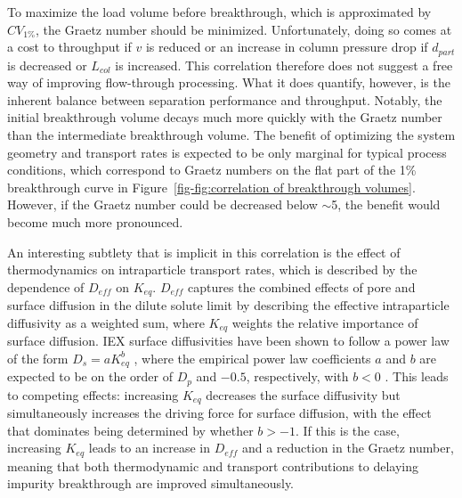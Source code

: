 \documentclass[preprint,review,12pt]{elsarticle}
\begin{document}
        To maximize the load volume before breakthrough, which is approximated by $CV_{1\%}$, the Graetz number should be minimized. Unfortunately, doing so comes at a cost to throughput if $v$ is reduced or an increase in column pressure drop if $d_{part}$ is decreased or $L_{col}$ is increased. This correlation therefore does not suggest a free way of improving flow-through processing. What it does quantify, however, is the inherent balance between separation performance and throughput. Notably, the initial breakthrough volume decays much more quickly with the Graetz number than the intermediate breakthrough volume. The benefit of optimizing the system geometry and transport rates is expected to be only marginal for typical process conditions, which correspond to Graetz numbers on the flat part of the 1\% breakthrough curve in Figure~\ref{fig-fig:correlation of breakthrough volumes}. However, if the Graetz number could be decreased below $\sim$5, the benefit would become much more pronounced.

        An interesting subtlety that is implicit in this correlation is the effect of thermodynamics on intraparticle transport rates, which is described by the dependence of $D_{eff}$ on $K_{eq}$. $D_{eff}$ captures the combined effects of pore and surface diffusion in the dilute solute limit by describing the effective intraparticle diffusivity as a weighted sum, where $K_{eq}$ weights the relative importance of surface diffusion. IEX surface diffusivities have been shown to follow a power law of the form $D_s = a K_{eq}^b$ \cite{Khanal7004}, where the empirical power law coefficients $a$ and $b$ are expected to be on the order of $D_p$ and $-0.5$, respectively, with $b < 0$ \cite{Wesselingh2001, Lenhoff2008}. This leads to competing effects: increasing $K_{eq}$ decreases the surface diffusivity but simultaneously increases the driving force for surface diffusion, with the effect that dominates being determined by whether $b > -1$. If this is the case, increasing $K_{eq}$ leads to an increase in $D_{eff}$ and a reduction in the Graetz number, meaning that both thermodynamic and transport contributions to delaying impurity breakthrough are improved simultaneously.
\end{document}
